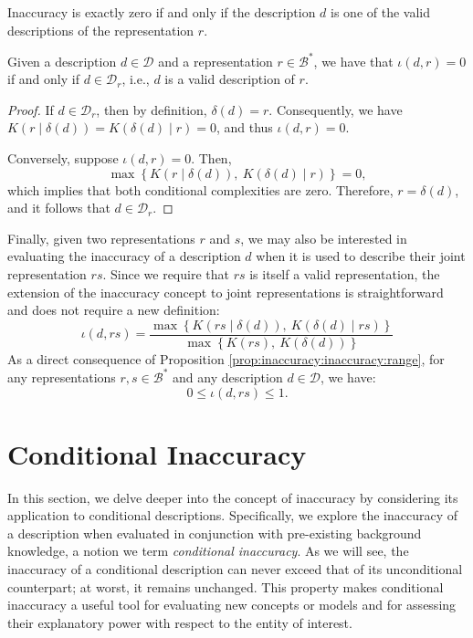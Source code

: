 Inaccuracy is exactly zero if and only if the description $d$ is one of the valid descriptions of the representation $r$.

\begin{proposition}
\label{prop:inaccuracy_perfect_description}
Given a description $d \in \mathcal{D}$ and a representation $r \in \mathcal{B}^\ast$, we have that $\iota(d, r) = 0$ if and only if $d \in \mathcal{D}_r$, i.e., $d$ is a valid description of $r$.
\end{proposition}
\begin{proof}
If $d \in \mathcal{D}_r$, then by definition, $\delta(d) = r$. Consequently, we have $K \left( r \mid \delta(d) \right) = K \left( \delta(d) \mid r \right) = 0$, and thus $\iota(d, r) = 0$.

Conversely, suppose $\iota(d, r) = 0$. Then,
\[
\max\left\{ K \left( r \mid \delta(d) \right),\ K \left( \delta(d) \mid r \right) \right\} = 0,
\]
which implies that both conditional complexities are zero. Therefore, $r = \delta(d)$, and it follows that $d \in \mathcal{D}_r$.
\end{proof}

Finally, given two representations $r$ and $s$, we may also be interested in evaluating the inaccuracy of a description $d$ when it is used to describe their joint representation $rs$. Since we require that $rs$ is itself a valid representation, the extension of the inaccuracy concept to joint representations is straightforward and does not require a new definition:
\[
\iota(d, rs) = \frac{ \max\left\{ K \left(rs \mid \delta(d) \right),\ K \left( \delta(d) \mid rs \right) \right\} }{ \max\left\{ K(rs),\ K \left(\delta(d) \right) \right\} }
\]
As a direct consequence of Proposition \ref{prop:inaccuracy:inaccuracy:range}, for any representations $r, s \in \mathcal{B}^\ast$ and any description $d \in \mathcal{D}$, we have:
\[
0 \leq \iota(d, rs) \leq 1.
\]

%
%

\section{Conditional Inaccuracy}

In this section, we delve deeper into the concept of inaccuracy by considering its application to conditional descriptions. Specifically, we explore the inaccuracy of a description when evaluated in conjunction with pre-existing background knowledge, a notion we term \emph{conditional inaccuracy}. As we will see, the inaccuracy of a conditional description can never exceed that of its unconditional counterpart; at worst, it remains unchanged. This property makes conditional inaccuracy a useful tool for evaluating new concepts or models and for assessing their explanatory power with respect to the entity of interest.

